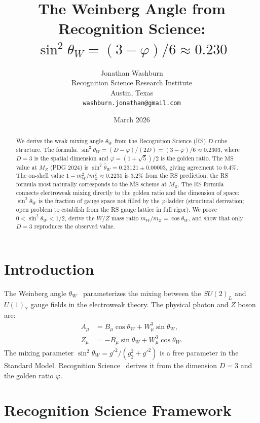 \documentclass[12pt,a4paper]{article}
\title{The Weinberg Angle from Recognition Science:\\
$\sin^2\theta_W = (3 - \varphi)/6 \approx 0.230$}
\author{Jonathan Washburn\\
Recognition Science Research Institute\\
Austin, Texas\\
\texttt{washburn.jonathan@gmail.com}}
\date{March 2026}
\theoremstyle{definition}
\theoremstyle{remark}
\begin{document}
\maketitle

\begin{abstract}
We derive the weak mixing angle $\theta_W$ from the Recognition
Science (RS) $D$-cube structure.  The formula:
$\sin^2\theta_W = (D - \varphi)/(2D) = (3 - \varphi)/6
\approx 0.2303$, where $D = 3$ is the spatial dimension and
$\varphi = (1+\sqrt{5})/2$ is the golden ratio.  The
$\overline{\mathrm{MS}}$ value at $M_Z$ (PDG 2024) is
$\sin^2\hat\theta_W = 0.23121 \pm 0.00003$, giving agreement
to $0.4\%$.  The on-shell value $1 - m_W^2/m_Z^2 \approx 0.2231$
is 3.2\% from the RS prediction; the RS formula most naturally
corresponds to the $\overline{\mathrm{MS}}$ scheme at $M_Z$.
The RS formula connects electroweak mixing directly to the golden
ratio and the dimension of space: $\sin^2\theta_W$ is the
fraction of gauge space not filled by the $\varphi$-ladder
(structural derivation; open problem to establish from the RS
gauge lattice in full rigor).  We prove $0 < \sin^2\theta_W < 1/2$,
derive the $W/Z$ mass ratio $m_W/m_Z = \cos\theta_W$, and show
that only $D = 3$ reproduces the observed value.
\end{abstract}

\section{Introduction}
\label{sec:intro}

The Weinberg angle $\theta_W$~\cite{Weinberg1967,Glashow1961}
parameterizes the mixing between the $SU(2)_L$ and $U(1)_Y$ gauge
fields in the electroweak theory.  The physical photon and $Z$ boson
are:
\begin{align}
  A_\mu &= B_\mu \cos\theta_W + W_\mu^3 \sin\theta_W, \\
  Z_\mu &= -B_\mu \sin\theta_W + W_\mu^3 \cos\theta_W.
\end{align}
The mixing parameter
$\sin^2\theta_W = g'^2/(g_2^2 + g'^2)$ is a free parameter in
the Standard Model.  Recognition Science~\cite{RS_Axioms} derives it
from the dimension $D = 3$ and the golden ratio $\varphi$.

\section{Recognition Science Framework}
\label{sec:framework}
\end{document}
